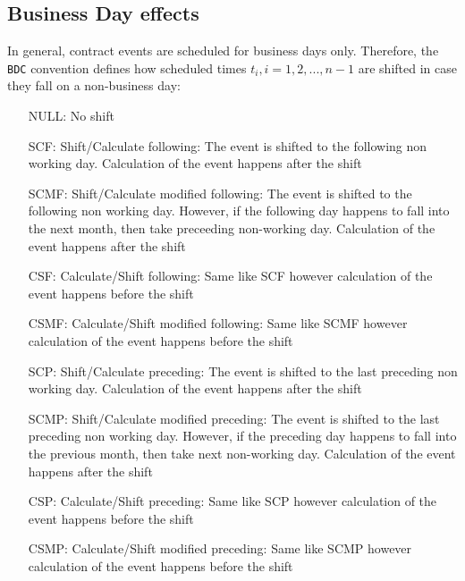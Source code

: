 \documentclass[9pt,oneside]{amsart}
\newcommand{\attr}[1]{\texttt{#1}}
\begin{document}
\begin{multicols}{2}
\subsection{Business Day effects}

In general, contract events are scheduled for business days only. Therefore, the \attr{BDC} convention defines how scheduled times $t_i,i=1,2,...,n-1$ are shifted in case they fall on a non-business day:

\begin{itemize}
	\item[NULL:] No shift

	\item[SCF:] Shift/Calculate following: The event is shifted to the following non working day. Calculation of the event happens after the shift

	\item[SCMF:] Shift/Calculate modified following: The event is shifted to the following non working day. However, if the following day happens to fall into the next month, then take preceeding non-working day. Calculation of the event happens after the shift

	\item[CSF:] Calculate/Shift following: Same like SCF however calculation of the event happens before the shift

	\item[CSMF:] Calculate/Shift modified following: Same like SCMF however calculation of the event happens before the shift

	\item[SCP:] Shift/Calculate preceding: The event is shifted to the last preceding non working day. Calculation of the event happens after the shift

	\item[SCMP:] Shift/Calculate modified preceding: The event is shifted to the last preceding non working day. However, if the preceding day happens to fall into the previous month, then take next non-working day. Calculation of the event happens after the shift

	\item[CSP:] Calculate/Shift preceding: Same like SCP however calculation of the event happens before the shift

	\item[CSMP:] Calculate/Shift modified preceding: Same like SCMP however calculation of the event happens before the shift
\end{itemize}




\end{multicols}
\end{document}
